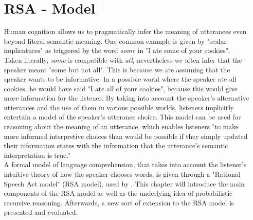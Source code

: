 \chapter{RSA - Model}
\label{chapter:rsa-model}
Human cognition allows us to pragmatically infer the meaning of utterances even beyond literal semantic meaning.
One common example is given by "scalar implicatures" as triggered by the word \textit{some} in "I ate some of your cookies". Taken literally, \textit{some} is compatible with \textit{all}, nevertheless we often infer that the speaker meant "some but not all". This is because we are assuming that the speaker wants to be informative. In a possible world where the speaker ate all cookies, he would have said "I ate all of your cookies", because this would give more information for the listener. By taking into account the speaker's alternative utterances and the use of them in various possible worlds, listeners implicitly entertain a model of the speaker's utterance choice. This model can be used for reasoning about the meaning of an utterance, which enables listeners "to make more informed interpretive choices than would be possible if they simply updated their information states with the information that the utterance's semantic interpretation is true." \citep{lassiter2017adjectival}\\

A formal model of language comprehension, that takes into account the listener's intuitive theory of how the speaker chooses words, is given through a "Rational Speech Act model" (RSA model), used by \cite{goodman2013knowledge}.
This chapter will introduce the main components of the RSA model as well as the underlying idea of probabilistic recursive reasoning. Afterwards, a new sort of extension to the RSA model is presented and evaluated.

